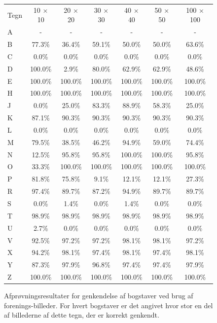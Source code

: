 \begin{figure}[htp]
\centering
\begin{tabular}{|l|c|c|c|c|c|c|}\hline
\rowcolor[gray]{0.9} \multicolumn{7}{|>{\columncolor[gray]{0.9}}c|}{\textbf{Genkendelse af bogstaver - Forenings-billeder}} \\ \hline
Tegn & 10 $\times$ 10 & 20 $\times$ 20 & 30 $\times$ 30 & 40 $\times$ 40 & 50 $\times$ 50 & 100 $\times$ 100\\\hline
A & - & - & - & - & - & -\\\hline
B & 77.3\% & 36.4\% & 59.1\% & 50.0\% & 50.0\% & 63.6\%\\\hline
C & 0.0\% & 0.0\% & 0.0\% & 0.0\% & 0.0\% & 0.0\%\\\hline
D & 100.0\% & 2.9\% & 80.0\% & 62.9\% & 62.9\% & 48.6\%\\\hline
E & 100.0\% & 100.0\% & 100.0\% & 100.0\% & 100.0\% & 100.0\%\\\hline
H & 100.0\% & 100.0\% & 100.0\% & 100.0\% & 100.0\% & 100.0\%\\\hline
J & 0.0\% & 25.0\% & 83.3\% & 88.9\% & 58.3\% & 25.0\%\\\hline
K & 87.1\% & 90.3\% & 90.3\% & 90.3\% & 90.3\% & 90.3\%\\\hline
L & 0.0\% & 0.0\% & 0.0\% & 0.0\% & 0.0\% & 0.0\%\\\hline
M & 79.5\% & 38.5\% & 46.2\% & 94.9\% & 59.0\% & 74.4\%\\\hline
N & 12.5\% & 95.8\% & 95.8\% & 100.0\% & 100.0\% & 95.8\%\\\hline
O & 33.3\% & 100.0\% & 100.0\% & 100.0\% & 100.0\% & 100.0\%\\\hline
P & 81.8\% & 75.8\% & 9.1\% & 12.1\% & 12.1\% & 27.3\%\\\hline
R & 97.4\% & 89.7\% & 87.2\% & 94.9\% & 89.7\% & 89.7\%\\\hline
S & 0.0\% & 1.4\% & 0.0\% & 1.4\% & 0.0\% & 0.0\%\\\hline
T & 98.9\% & 98.9\% & 98.9\% & 98.9\% & 98.9\% & 98.9\%\\\hline
U & 2.7\% & 0.0\% & 0.0\% & 0.0\% & 0.0\% & 0.0\%\\\hline
V & 92.5\% & 97.2\% & 97.2\% & 98.1\% & 98.1\% & 97.2\%\\\hline
X & 94.2\% & 98.1\% & 97.4\% & 98.1\% & 97.4\% & 98.1\%\\\hline
Y & 87.3\% & 97.9\% & 96.8\% & 97.4\% & 97.4\% & 97.9\%\\\hline
Z & 100.0\% & 100.0\% & 100.0\% & 100.0\% & 100.0\% & 100.0\%\\\hline
\end{tabular}
\caption{Afprøvningsresultater for genkendelse af bogstaver ved brug af forenings-billeder. For hvert bogstaver er det angivet hvor stor en del af billederne af dette tegn, der er korrekt genkendt.}
\label{fig:test:and_bogstav}
\end{figure}

